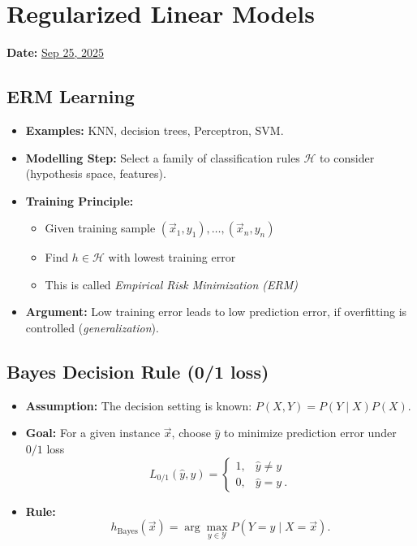 \section{Regularized Linear Models}
\textbf{Date:} \underline{Sep 25, 2025}

\subsection{ERM Learning}

\begin{itemize}
    \item \textbf{Examples:} KNN, decision trees, Perceptron, SVM.
    \item \textbf{Modelling Step:} Select a family of classification rules $\mathcal{H}$ to consider (hypothesis space, features).
    \item \textbf{Training Principle:}
    \begin{itemize}
        \item Given training sample $(\vec{x}_1, y_1), \ldots, (\vec{x}_n, y_n)$
        \item Find $h \in \mathcal{H}$ with lowest training error
        \item This is called \textit{Empirical Risk Minimization (ERM)}
    \end{itemize}
    \item \textbf{Argument:} Low training error leads to low prediction error, if overfitting is controlled (\textit{generalization}).
\end{itemize}

\subsection{Bayes Decision Rule (0/1 loss)}
\begin{itemize}
    \item \textbf{Assumption:} The decision setting is known: $P(X,Y) = P(Y\mid X)P(X)$.
    \item \textbf{Goal:} For a given instance $\vec{x}$, choose $\hat{y}$ to minimize prediction error under $0/1$ loss
    \[
      L_{0/1}(\hat{y},y)=\begin{cases}
      1,& \hat{y}\neq y\\
      0,& \hat{y}=y~.
      \end{cases}
    \]
    \item \textbf{Rule:} 
    \[
      h_{\text{Bayes}}(\vec{x})=\arg\max_{y\in\mathcal{Y}} P(Y=y\mid X=\vec{x}).
    \]
\end{itemize}


